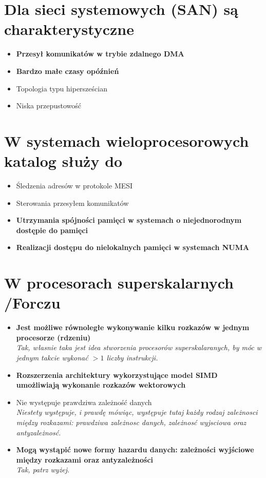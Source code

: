 \documentclass[a4paper,twoside]{article}
\begin{document}
\section{Dla sieci systemowych (SAN) są charakterystyczne}
	\begin{itemize}
    \item \textbf{Przesył komunikatów w trybie zdalnego DMA}
    \item \textbf{Bardzo małe czasy opóźnień}
    \item Topologia typu hipersześcian
    \item Niska przepustowość
    \end{itemize}

\section{W systemach wieloprocesorowych katalog służy do}
	\begin{itemize}
    \item Śledzenia adresów w protokole MESI
    \item Sterowania przesyłem komunikatów
    \item \textbf{Utrzymania spójności pamięci w systemach o niejednorodnym dostępie do pamięci}
    \item \textbf{Realizacji dostępu do nielokalnych pamięci w systemach NUMA}
    \end{itemize}

\section{W procesorach superskalarnych {\small /Forczu}}
	\begin{itemize}
    \item \textbf{Jest możliwe równoległe wykonywanie kilku rozkazów w jednym procesorze (rdzeniu)}\\
    {\small \emph{Tak, własnie taka jest idea stworzenia procesorów superskalaranych, by móc w jednym takcie wykonać $>1$ liczby instrukcji.}}
    \item \textbf{Rozszerzenia architektury wykorzystujące model SIMD umożliwiają wykonanie rozkazów wektorowych}
    \item Nie występuje prawdziwa zależność danych\\
    {\small \emph{Niestety występuje, i prawdę mówiąc, występuje tutaj każdy rodzaj zależnosci między rozkazami: prawdziwa zależnosc danych, zależnosć wyjsciowa oraz antyzależnosć.}}
    \item \textbf{Mogą wystąpić nowe formy hazardu danych: zależności wyjściowe między rozkazami oraz antyzależności}\\
    {\small \emph{Tak, patrz wyżej.}}
    \end{itemize}
\end{document}
